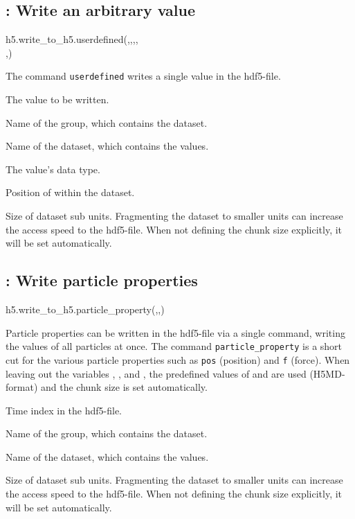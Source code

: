 \subsection{: Write an arbitrary value}
\begin{pyessyntax}
h5.write_to_h5.userdefined(,,,,\\,)
\end{pyessyntax}
The command \texttt{userdefined} writes a single value in the hdf5-file.
\begin{arguments}
\item[\var{value}] The value to be written.
\item[\var{groupname}] Name of the group, which contains the dataset.
\item[\var{datasetname}] Name of the dataset, which contains the values.
\item[\var{datatype}] The value's data type.
\item[\var{datasetindex}] Position of  within the dataset.
\item[\var{chunks}] Size of dataset sub units. Fragmenting the dataset to smaller units can increase the access speed to the hdf5-file. When not defining the chunk size explicitly, it will be set automatically.
\end{arguments}

\subsection{: Write particle properties}
\begin{pyessyntax}
h5.write_to_h5.particle_property(,,)
\end{pyessyntax}
Particle properties can be written in the hdf5-file via a single command, writing the values of all particles at once. The command \texttt{particle_property} is a short cut for the various particle properties such as \texttt{pos} (position) and \texttt{f} (force). When leaving out the variables , , and , the predefined values of  and  are used (H5MD-format) and the chunk size is set automatically.
\begin{arguments}
\item[\var{timestep}] Time index in the hdf5-file.
\item[\var{groupname}] Name of the group, which contains the dataset.
\item[\var{datasetname}] Name of the dataset, which contains the values.
\item[\var{chunks}] Size of dataset sub units. Fragmenting the dataset to smaller units can increase the access speed to the hdf5-file. When not defining the chunk size explicitly, it will be set automatically.
\end{arguments}


